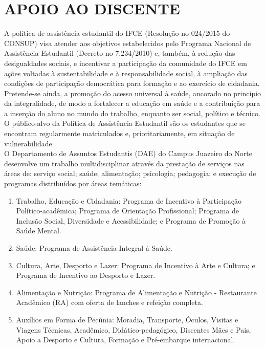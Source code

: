 \chapter{APOIO AO DISCENTE}

A política de assistência estudantil do IFCE (Resolução no 024/2015 do CONSUP) visa atender aos objetivos estabelecidos pelo Programa Nacional de Assistência Estudantil (Decreto no 7.234/2010) e, também, à redução das desigualdades sociais, e incentivar a participação da comunidade do IFCE em ações voltadas à sustentabilidade e à responsabilidade social, à ampliação das condições de participação democrática para formação e ao exercício de cidadania. Pretende-se ainda, a promoção do acesso universal à saúde, ancorado no princípio da integralidade, de modo a fortalecer a educação em saúde e a contribuição para a inserção do aluno no mundo do trabalho, enquanto ser social, político e técnico.\\

O público-alvo da Política de Assistência Estudantil são os estudantes que se encontram regularmente matriculados e, prioritariamente, em situação de vulnerabilidade.\\

O Departamento de Assuntos Estudantis (DAE) do Campus Juazeiro do Norte desenvolve um trabalho multidisciplinar através da prestação de serviços nas áreas de: serviço social; saúde; alimentação; psicologia; pedagogia; e execução de programas distribuídos por áreas temáticas:

\begin{enumerate}[label=(\roman*),ref=\roman*]
\item Trabalho, Educação e Cidadania: Programa de Incentivo à Participação Político-acadêmica; Programa de Orientação Profissional; Programa de Inclusão Social, Diversidade e Acessibilidade; e Programa de Promoção à Saúde Mental.
\item  Saúde: Programa de Assistência Integral à Saúde.
\item  Cultura, Arte, Desporto e Lazer: Programa de Incentivo à Arte e Cultura; e Programa de Incentivo ao Desporto e Lazer.
\item  Alimentação e Nutrição: Programa de Alimentação e Nutrição - Restaurante Acadêmico (RA) com oferta de lanches e refeição completa.
\item  Auxílios em Forma de Pecúnia: Moradia, Transporte, Óculos, Visitas e Viagens Técnicas, Acadêmico, Didático-pedagógico, Discentes Mães e Pais, Apoio a Desporto e Cultura, Formação e Pré-embarque internacional.

\end{enumerate}

